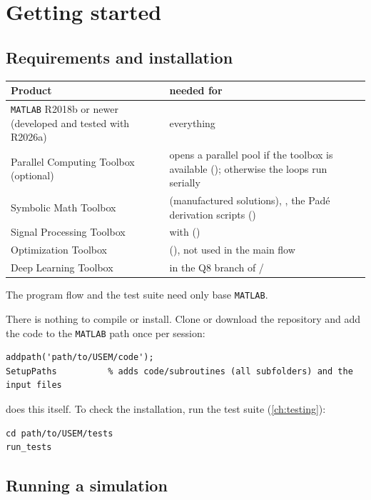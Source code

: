 \chapter{Getting started}
\label{ch:start}

\section{Requirements and installation}

\begin{xltabular}{\linewidth}{@{}P{5.2cm}L@{}}
  \toprule
  Product & needed for \\
  \midrule
  \endhead
  \texttt{MATLAB} R2018b or newer (developed and tested with R2026a) & everything \\
  Parallel Computing Toolbox (optional) &  opens a parallel
    pool if the toolbox is available (); otherwise the
     loops run serially \\
  Symbolic Math Toolbox &  (manufactured solutions),
    , the Padé derivation scripts
    () \\
  Signal Processing Toolbox &  with 
    () \\
  Optimization Toolbox &  (), not
    used in the main flow \\
  Deep Learning Toolbox &  in the Q8 branch of 
    /  \\
  \bottomrule
\end{xltabular}
The program flow and the test suite need only base \texttt{MATLAB}.

There is nothing to compile or install. Clone or download the repository and add
the code to the \texttt{MATLAB} path once per session:
\begin{lstlisting}
addpath('path/to/USEM/code');
SetupPaths          % adds code/subroutines (all subfolders) and the input files
\end{lstlisting}
 does this itself. To check the installation, run the test
suite (\cref{ch:testing}):
\begin{lstlisting}
cd path/to/USEM/tests
run_tests
\end{lstlisting}

\section{Running a simulation}

